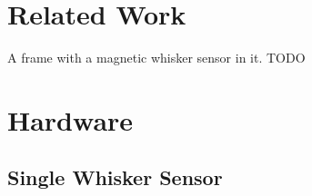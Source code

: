 \documentclass[AIRbeamer
,optEnglish
,optBiber
,optBibstyleAlphabetic
,optBeamerClassicFormat%
]{AIRlatex}
\begin{document}
    \section{Related Work}

    \begin{frame}
        A frame with a magnetic whisker sensor in it.
        \alert{TODO}
    \end{frame}


    \section{Hardware}

    \subsection{Single Whisker Sensor}
\end{document}
